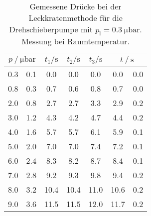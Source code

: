 \begin{table}
\centering
\caption{Gemessene Drücke bei der Leckkratenmethode für die Drehschieberpumpe mit $p_{\mathrm{l}}=\SI{0.3}{\micro\bar}$. Messung bei Raumtemperatur.}
\label{tab: leck_turbo_leck_0.3.pdf}
\begin{tabular}{S[table-format=1.1]@{${}\pm{}$} S[table-format=1.1] S S S S[table-format=1.1]@{${}\pm{}$} S[table-format=1.1] }
\toprule
{} & {$t_1 / \si{ \second}$} & {$t_2 / \si{ \second}$} & {$t_3 / \si{ \second}$} &  \\
 & 0.1 & 0.0 & 0.0 & 0.0 & 0.0 & 0.0\\
0.8 & 0.3 & 0.7 & 0.6 & 0.8 & 0.7 & 0.0\\
2.0 & 0.8 & 2.7 & 2.7 & 3.3 & 2.9 & 0.2\\
3.0 & 1.2 & 4.3 & 4.2 & 4.7 & 4.4 & 0.2\\
4.0 & 1.6 & 5.7 & 5.7 & 6.1 & 5.9 & 0.1\\
5.0 & 2.0 & 7.0 & 7.0 & 7.4 & 7.2 & 0.1\\
6.0 & 2.4 & 8.3 & 8.2 & 8.7 & 8.4 & 0.1\\
7.0 & 2.8 & 9.2 & 9.3 & 9.8 & 9.4 & 0.2\\
8.0 & 3.2 & 10.4 & 10.4 & 11.0 & 10.6 & 0.2\\
9.0 & 3.6 & 11.5 & 11.5 & 12.0 & 11.7 & 0.2\\
\bottomrule
\end{tabular}
\end{table}
